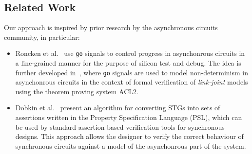 


\subsection{Related Work}
\label{subsec:related}

Our approach is inspired by prior research by the asynchronous circuits
community, in particular:

\begin{itemize}

\item Roncken et al.~\cite{roncken2015naturalized} use \texttt{go} signals to
control progress in asynchonrous circuits in a fine-grained manner for the
purpose of silicon test and debug. The idea is further developed
in~\cite{chau2017framework}, where \texttt{go} signals are used to model
non-determinism in asynchonrous circuits in the context of formal verification
of \emph{link-joint} models using the theorem proving system ACL2.

\item Dobkin et al.~\cite{dobkin2008assertion} present an algorithm for
converting STGs into sets of assertions written in the Property Specification
Language (PSL), which can be used by standard assertion-based verification
tools for synchronous designs. This approach allows the designer to verify the
correct behaviour of synchronous circuits against a model of the asynchonrous
part of the system.

\end{itemize}

